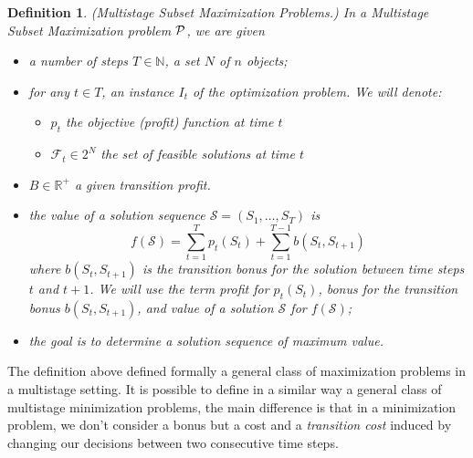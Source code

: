 \documentclass[a4paper]{book}
\newtheorem{definition}{Definition}
\begin{document}
\begin{definition}
\emph{(Multistage Subset Maximization Problems.)} In a Multistage Subset Maximization problem $\cal P$, we are given
\begin{itemize}
\item a number of steps $T \in \mathbb{N}$, a set $N$ of $n$ objects;
\item for any $t \in T$, an instance $I_t$ of the optimization problem. We will denote:
\begin{itemize}
\item $p_{t}$ the objective (profit) function at time $t$
\item $\mathcal{F}_t\in 2^N$ the set of feasible solutions at time $t$
\end{itemize} 
\item $B \in \mathbb{R^{+}}$ a given \textit{transition profit}. 
\item the value of a solution sequence $\mathcal{S}=(S_1,\dots,S_T)$ is $$f(\mathcal{S})=\sum_{t=1}^T p_t(S_t) + \sum_{t=1}^{T-1} b(S_t,S_{t+1})$$
where $b(S_t,S_{t+1})$ is the transition bonus for the solution between time steps $t$ and $t+1$. We will use the term {\it profit} for $ p_t(S_t)$, {\it bonus} for the transition bonus $b(S_t,S_{t+1})$, and {\it value} of a solution $\mathcal{S}$ for $f(\mathcal{S})$;
\item the goal is to determine a solution sequence of maximum value. 
\end{itemize}
\end{definition}

The definition above defined formally a general class of maximization problems in a multistage setting. It is possible to define in a similar way a general class of multistage minimization problems, the main difference is that in a minimization problem, we don't consider a bonus but a cost and a \textit{transition cost} induced by changing our decisions between two consecutive time steps.
\end{document}
